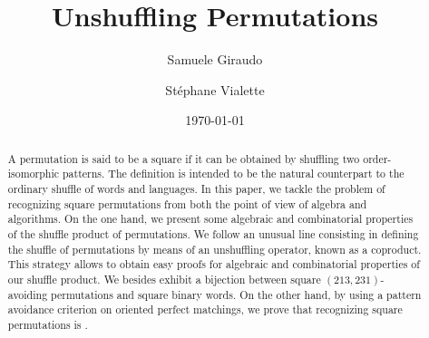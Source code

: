 \documentclass[a4paper]{llncs}
\begin{document}

\title{%
Unshuffling Permutations}%

\author{%
  Samuele Giraudo \and
  St\'ephane Vialette
}%
\date{\today}

\maketitle


\begin{abstract}
    A permutation is said to be a square if it can be obtained by
    shuffling two order-isomorphic patterns. The definition is intended
    to be the natural counterpart to the ordinary shuffle of words and
    languages. In this paper, we tackle the problem of recognizing square
    permutations from both the point of view of algebra and algorithms.
    On the one hand, we present some algebraic and combinatorial
    properties of the shuffle product of permutations. We follow an
    unusual line consisting in defining the shuffle of permutations by
    means of an unshuffling operator, known as a coproduct. This
    strategy allows to obtain easy proofs for algebraic and combinatorial
    properties of our shuffle product. We besides exhibit a bijection
    between square $(213,231)$-avoiding permutations and square binary
    words. On the other hand, by using a pattern avoidance criterion on
    oriented perfect matchings, we prove that recognizing square 
    permutations is \NPC.
\end{abstract}


\end{document}
